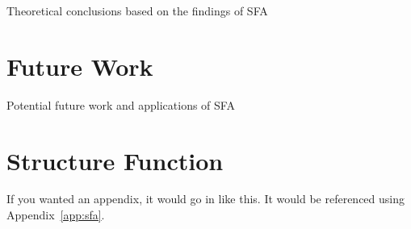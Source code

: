 \documentclass[12pt, oneside]{smuthesis}
\begin{document}
Theoretical conclusions based on the findings of SFA

\chapter{\sc Future Work} \label{futureWork}

Potential future work and applications of SFA


\appendix

\chapter{Structure Function} \label{appendixSFA}
\label{app:sfa}
If you wanted an appendix, it would go in like this.  It would be 
referenced using Appendix~\ref{app:sfa}.


\begin{singlespace}

\end{singlespace}
\end{document}
